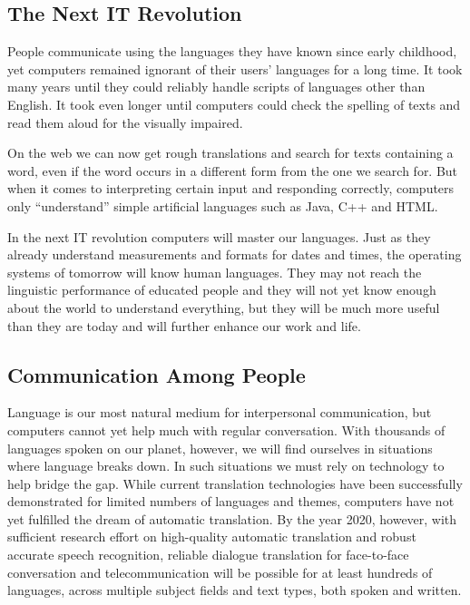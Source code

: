 \documentclass[10pt, plain]{../../metanetpaper}
\begin{document}
\begin{multicols}{2}
\subsection{The Next IT Revolution}
\label{sec:introduction-vision}

People communicate using the languages they have known since early childhood, yet computers remained ignorant of their users’ languages for a long time. It took many years until they could reliably handle scripts of languages other than English. It took even longer until computers could check the spelling of texts and read them aloud for the visually impaired.
 
On the web we can now get rough translations and search for texts containing a word, even if the word occurs in a different form from the one we search for. But when it comes to interpreting certain input and responding correctly, computers only “understand” simple artificial languages such as Java, C++ and HTML.
 
In the next IT revolution computers will master our languages. Just as they already understand measurements and formats for dates and times, the operating systems of tomorrow will know human languages. They may not reach the linguistic performance of educated people and they will not yet know enough about the world to understand everything, but they will be much more useful than they are today and will further enhance our work and life.

\subsection{Communication Among People}
\label{sec:comm-among-people}

Language is our most natural medium for interpersonal communication, but computers cannot yet help much with regular conversation. With thousands of languages spoken on our planet, however, we will find ourselves in situations where language breaks down. In such situations we must rely on technology to help bridge the gap. While current translation technologies have been successfully demonstrated for limited numbers of languages and themes, computers have not yet fulfilled the dream of automatic translation. By the year 2020, however, with sufficient research effort on high-quality automatic translation and robust accurate speech recognition, reliable dialogue translation for face-to-face conversation and telecommunication will be possible for at least hundreds of languages, across multiple subject fields and text types, both spoken and written.


\end{multicols}
\end{document}
